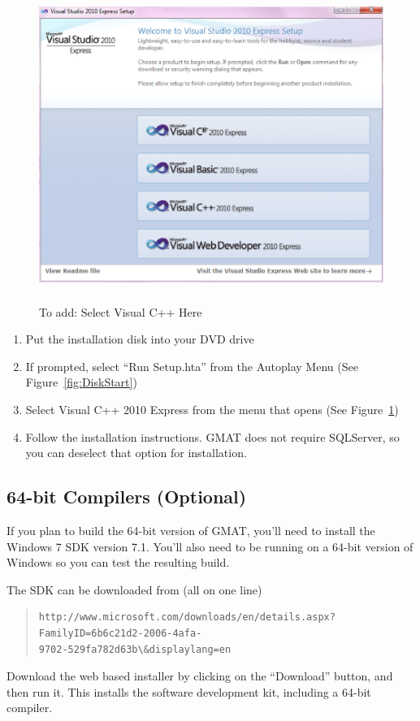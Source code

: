 \documentclass[letterpaper,10pt]{article}%
\begin{document}
\begin{figure}
	\centering
		\includegraphics[height=4in,width=6in,keepaspectratio]{VisualCpp.eps}
	\caption{To add: Select Visual C++ Here}
	\label{fig:VisualCpp}
\end{figure}

\begin{enumerate}
\item Put the installation disk into your DVD drive
\item If prompted, select ``Run Setup.hta'' from the Autoplay Menu (See Figure~\ref{fig:DiskStart})
\item Select Visual C++ 2010 Express from the menu that opens (See Figure~\ref{fig:VisualCpp})
\item Follow the installation instructions.  GMAT does not require SQLServer, so you can deselect that option for installation.
\end{enumerate}

\subsection{64-bit Compilers (Optional)}

If you plan to build the 64-bit version of GMAT, you'll need to install the Windows 7 SDK version 7.1.  You'll also need to be running on a 64-bit version of Windows so you can test the resulting build.

The SDK can be downloaded from (all on one line)
\begin{quote}
\begin{verbatim}
http://www.microsoft.com/downloads/en/details.aspx?FamilyID=6b6c21d2-2006-4afa-
9702-529fa782d63b\&displaylang=en
\end{verbatim}
\end{quote}
\noindent Download the web based installer by clicking on the ``Download'' button, and then run it.  This installs the software development kit, including a 64-bit compiler.
\end{document}
